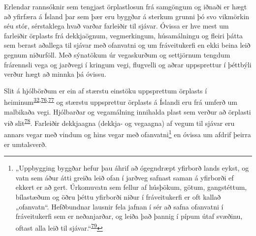 \documentclass[icelandic,]{book}
\let\rmarkdownfootnote\footnote%
\def\footnote{\protect\rmarkdownfootnote}
\begin{document}
Erlendar rannsóknir sem tengjast örplastlosun frá samgöngum og iðnaði er hægt að yfirfæra á Ísland þar sem þær eru byggðar á sterkum grunni þó svo vikmörkin séu stór, sérstaklega hvað varðar farleiðir til sjávar. Óvissa er hve mest um farleiðir örplasts frá dekkjaögnum, vegmerkingum, húsamálningu og fleiri þátta sem berast aðallega til sjávar með ofanvatni og um fráveitukerfi en ekki beina leið gegnum niðurföll. Með sýnatökum úr vegaskurðum og settjörnum tengdum frárennsli vega og jarðvegi í kringum vegi, flugvelli og aðrar uppsprettur í þéttbýli verður hægt að minnka þá óvissu.

Slit á hjólbörðum er ein af stærstu einstöku uppsprettum örplasts í heiminum\textsuperscript{\protect\hyperlink{ref-sundt2014sources}{32},\protect\hyperlink{ref-lassen2015microplastics}{76},\protect\hyperlink{ref-essel2015sources}{77}} og stærstu uppsprettur örplasts á Íslandi eru frá umferð um malbikaða vegi. Hjólbarðar og vegamálning innihalda plast sem verður að örplasti við slit\textsuperscript{\protect\hyperlink{ref-kreider2010physical}{78}}. Farleiðir dekkjaagna (dekkja- og vegaagna) af vegum til sjávar eru annars vegar með vindum og hins vegar með ofanvatni\footnote{„Uppbygging byggðar hefur þau áhrif að ógegndræpt yfirborð lands eykst, og vatn sem áður átti greiða leið ofan í jarðveg safnast saman á yfirborði ef ekkert er að gert. Úrkomuvatn sem fellur af húsþökum, götum, gangstéttum, bílastæðum og öðru þéttu yfirborði niður í fráveitukerfi er oft kallað „ofanvatn``. Hefðbundnar lausnir fela jafnan í sér að safna ofanvatni í fráveitukerfi sem er neðanjarðar, og leiða það þannig í pípum útaf svæðinu, oftast alla leið til sjávar.``\textsuperscript{\protect\hyperlink{ref-StefanFreyr}{79}}} en óvissa um afdrif þeirra er umtalsverð.
\end{document}
